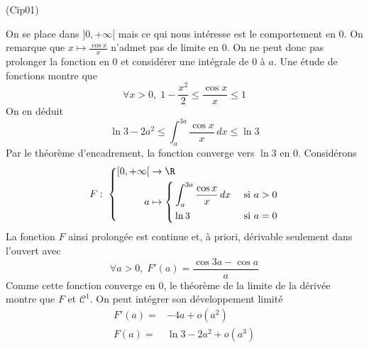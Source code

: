\begin{tiny}(Cip01)\end{tiny} On se place dans $]0,+\infty[$ mais ce qui nous intéresse est le comportement en $0$. On remarque que $x\mapsto \frac{\cos x}{x}$ n'admet pas de limite en $0$. On ne peut donc pas prolonger la fonction en $0$ et considérer une intégrale de $0$ à $a$.\newline
Une étude de fonctions montre que
\begin{displaymath}
\forall x>0,\;
1 - \frac{x^2}{2} \leq \frac{\cos x}{x} \leq 1
\end{displaymath}
On en déduit
\begin{displaymath}
  \ln 3 - 2a^2 \leq \int_{a}^{3a}\frac{\cos x}{x}\,dx \leq \ln 3
\end{displaymath}
Par le théorème d'encadrement, la fonction converge vers $\ln 3$ en $0$. Considérons
\begin{displaymath}
  F:\;
\left\lbrace 
  \begin{aligned}
    \left[0, +\infty\right[ &\rightarrow \R \\
    a &\mapsto
      \left\lbrace 
        \begin{aligned}
          &\int_{a}^{3a}\frac{\cos x}{x}\,dx &\text{ si } a>0 \\
          &\ln 3 &\text{ si } a = 0
        \end{aligned}
      \right.
    \end{aligned}
\right. 
\end{displaymath}
La fonction $F$ ainsi prolongée est continue et, à priori, dérivable seulement dans l'ouvert avec
\begin{displaymath}
\forall a>0, \;
F'(a) = \frac{\cos 3a - \cos a}{a}
\end{displaymath}
Comme cette fonction converge en $0$, le théorème de la limite de la dérivée montre que $F$ et $\mathcal{C}^1$. On peut intégrer son développement limité
\begin{align*}
  F'(a) =& -4a + o(a^2) \\
  F(a) =& \ln 3 -2a^2 + o(a^3)
\end{align*}

